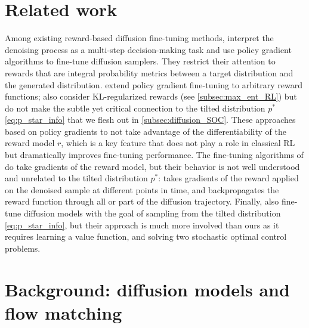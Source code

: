 \documentclass[]{fairmeta}
\begin{document}
\section{Related work} 
Among existing reward-based diffusion fine-tuning methods, \cite{fan2023optimizing} interpret the denoising process as a multi-step decision-making task and use policy gradient algorithms to fine-tune diffusion samplers. They restrict their attention to rewards that are integral probability metrics between a target distribution and the generated distribution. \cite{black2024training,fan2023dpok} extend policy gradient fine-tuning to arbitrary reward functions; \cite{black2024training} also consider KL-regularized rewards (see \autoref{subsec:max_ent_RL}) but do not make the subtle yet critical connection to the tilted distribution $p^*$ \eqref{eq:p_star_info} that we flesh out in \autoref{subsec:diffusion_SOC}. 
These approaches based on policy gradients to not take advantage of the differentiability of the reward model $r$, which is a key feature that does not play a role in classical RL but dramatically improves fine-tuning performance. The fine-tuning algorithms of \cite{xu2023imagereward,clark2024directly} do take gradients of the reward model, but their behavior is not well understood and unrelated to the tilted distribution $p^*$: \cite{xu2023imagereward} takes gradients of the reward applied on the denoised sample at different points in time, and \cite{clark2024directly} backpropagates the reward function through all or part of the diffusion trajectory. Finally, \cite{uehara2024finetuning} also fine-tune diffusion models with the goal of sampling from the tilted distribution \eqref{eq:p_star_info}, but their approach is much more involved than ours as it requires learning a value function, and solving two stochastic optimal control problems.


\section{Background: diffusion models and flow matching} \label{sec:background}
\end{document}
